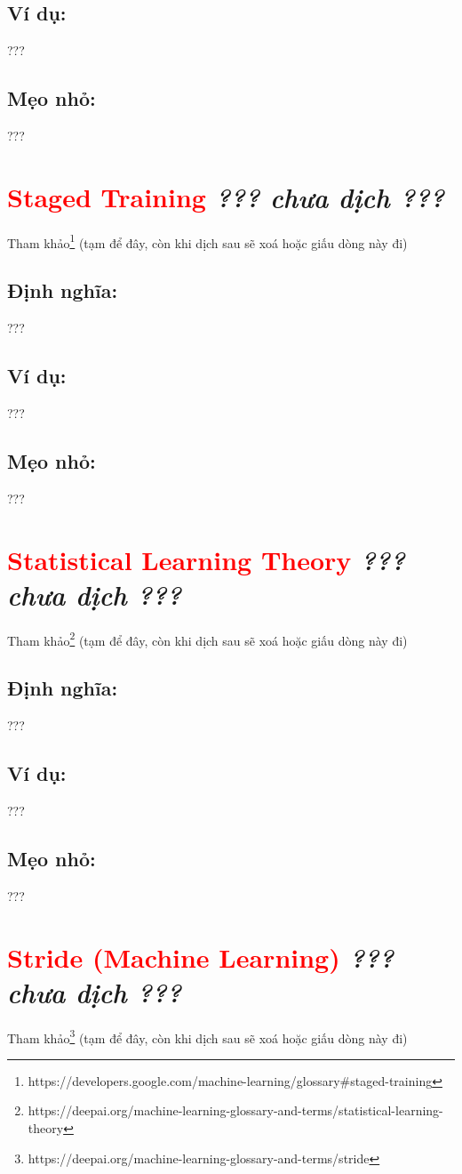 \subsection*{Ví dụ:}
???
\subsection*{Mẹo nhỏ:}
???
\section*{\huge \textcolor{Red}{Staged Training}  \small \textit{??? chưa dịch ???} }
Tham khảo\footnote{https://developers.google.com/machine-learning/glossary\#staged-training} (tạm để đây, còn khi dịch sau sẽ xoá hoặc giấu dòng này đi)
\subsection*{Định nghĩa:}
???
\subsection*{Ví dụ:}
???
\subsection*{Mẹo nhỏ:}
???
\section*{\huge \textcolor{Red}{Statistical Learning Theory}  \small \textit{??? chưa dịch ???} }
Tham khảo\footnote{https://deepai.org/machine-learning-glossary-and-terms/statistical-learning-theory} (tạm để đây, còn khi dịch sau sẽ xoá hoặc giấu dòng này đi)
\subsection*{Định nghĩa:}
???
\subsection*{Ví dụ:}
???
\subsection*{Mẹo nhỏ:}
???
\section*{\huge \textcolor{Red}{Stride (Machine Learning)}  \small \textit{??? chưa dịch ???} }
Tham khảo\footnote{https://deepai.org/machine-learning-glossary-and-terms/stride} (tạm để đây, còn khi dịch sau sẽ xoá hoặc giấu dòng này đi)
